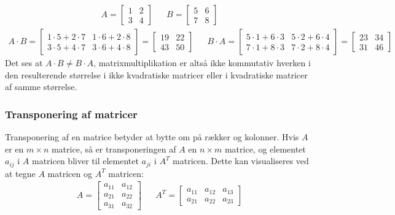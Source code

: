 \documentclass{article}
\begin{document}
\begin{align}
  A = \begin{bmatrix}
    1 & 2 \\
    3 & 4
  \end{bmatrix}
  &&
  B = \begin{bmatrix}
    5 & 6 \\
    7 & 8
  \end{bmatrix}
\end{align}
\begin{align}
  A \cdot B = \begin{bmatrix}
    1 \cdot 5 + 2 \cdot 7 & 1 \cdot 6 + 2 \cdot 8 \\
    3 \cdot 5 + 4 \cdot 7 & 3 \cdot 6 + 4 \cdot 8
  \end{bmatrix} = \begin{bmatrix}
    19 & 22 \\
    43 & 50
  \end{bmatrix}
  &&
  B \cdot A = \begin{bmatrix}
    5 \cdot 1 + 6 \cdot 3 & 5 \cdot 2 + 6 \cdot 4 \\
    7 \cdot 1 + 8 \cdot 3 & 7 \cdot 2 + 8 \cdot 4
  \end{bmatrix} = \begin{bmatrix}
    23 & 34 \\
    31 & 46
  \end{bmatrix}
\end{align}
Det ses at $A \cdot B \neq B \cdot A$, matrixmultiplikation er altså ikke kommutativ hverken i den resulterende størrelse i ikke kvadratiske matricer eller i kvadratiske matricer af samme størrelse. \parencite{Lauritzen_2019}
\subsubsection{Transponering af matricer}
Transponering af en matrice betyder at bytte om på rækker og kolonner. Hvis $A$ er en $m \times n$ matrice, så er transponeringen af $A$ en $n \times m$ matrice, og elementet $a_{ij}$ i $A$ matricen bliver til elementet $a_{ji}$ i $A^T$ matricen. Dette kan visualiseres ved at tegne $A$ matricen og $A^T$ matricen:
\begin{align}
  A = \begin{bmatrix}
    a_{11} & a_{12} \\
    a_{21} & a_{22} \\
    a_{31} & a_{32}
  \end{bmatrix}
  &&
  A^T = \begin{bmatrix}
    a_{11} & a_{12} & a_{13} \\
    a_{21} & a_{22} & a_{23}
  \end{bmatrix}
\end{align}
\end{document}
